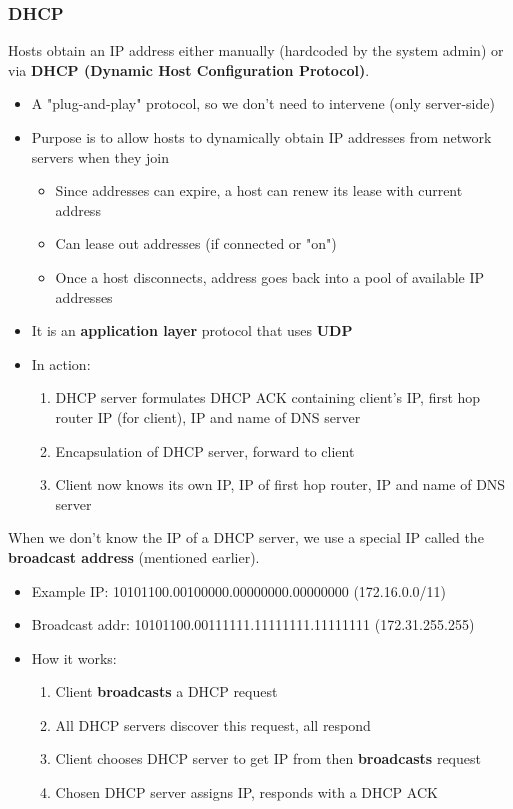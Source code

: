 \documentclass{article}
\begin{document}
\subsubsection{DHCP}
Hosts obtain an IP address either manually (hardcoded by the system admin) or via \textbf{DHCP (Dynamic Host 
Configuration Protocol)}.
\begin{itemize}
    \item A "plug-and-play" protocol, so we don't need to intervene (only server-side)
    \item Purpose is to allow hosts to dynamically obtain IP addresses from network servers when they join
    \begin{itemize}
        \item Since addresses can expire, a host can renew its lease with current address
        \item Can lease out addresses (if connected or "on")
        \item Once a host disconnects, address goes back into a pool of available IP addresses
    \end{itemize}
    \item It is an \textbf{application layer} protocol that uses \textbf{UDP}
    \item In action:
    \begin{enumerate}
        \item DHCP server formulates DHCP ACK containing client's IP, first hop router IP (for client),
        IP and name of DNS server
        \item Encapsulation of DHCP server, forward to client
        \item Client now knows its own IP, IP of first hop router, IP and name of DNS server 
    \end{enumerate}
\end{itemize}
When we don't know the IP of a DHCP server, we use a special IP called the \textbf{broadcast address}
(mentioned earlier).
\begin{itemize}
    \item Example IP: 10101100.00100000.00000000.00000000 (172.16.0.0/11)
    \item Broadcast addr: 10101100.00111111.11111111.11111111 (172.31.255.255)
    \item How it works:
    \begin{enumerate}
        \item Client \textbf{broadcasts} a DHCP request
        \item All DHCP servers discover this request, all respond
        \item Client chooses DHCP server to get IP from then \textbf{broadcasts} request
        \item Chosen DHCP server assigns IP, responds with a DHCP ACK
    \end{enumerate}
\end{itemize}
\newpage
\end{document}
